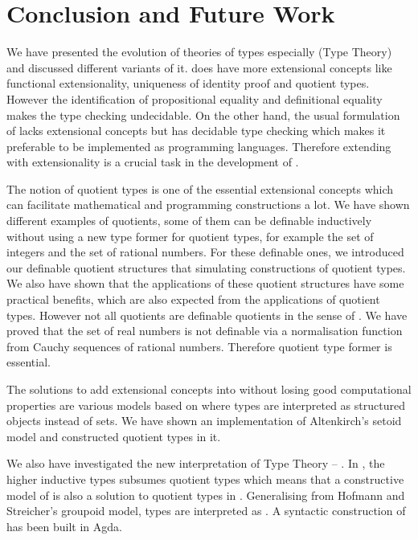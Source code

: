 \chapter{Conclusion and Future Work}

We have presented the evolution of theories of types especially \mltt (Type Theory) and discussed different variants of it. \ett does have more extensional concepts like functional extensionality, uniqueness of identity proof and quotient types. However the identification of propositional equality and definitional equality makes the type checking undecidable. On the other hand, the usual formulation of \itt lacks extensional concepts but has decidable type checking which makes it preferable to be implemented as programming languages. Therefore extending \itt with extensionality is a crucial task in the development of \mltt.

The notion of quotient types is one of the essential extensional concepts which can facilitate mathematical and programming constructions a lot. We have shown different examples of quotients, some of them can be definable inductively without using a new type former for quotient types, for example the set of integers and the set of rational numbers. For these definable ones, we introduced our definable quotient structures that simulating constructions of quotient types. We also have shown that the applications of these quotient structures have some practical benefits, which are also expected from 
the applications of quotient types.
However not all quotients are definable quotients in the sense of . We have proved that the set of real numbers is not definable via a normalisation function from Cauchy sequences of rational numbers. Therefore quotient type former is essential.

The solutions to add extensional concepts into \itt without losing good computational properties are various models based on \itt where types are interpreted as structured objects instead of sets. We have shown an implementation of Altenkirch's setoid model and constructed quotient types in it.

We also have investigated the new interpretation of Type Theory -- \hott. In \hott, the higher inductive types subsumes quotient types which means that a constructive model of \hott is also a solution to quotient types in \itt.
Generalising from Hofmann and Streicher's groupoid model, types are interpreted as \wog. A syntactic construction of \wog has been built in Agda. 

